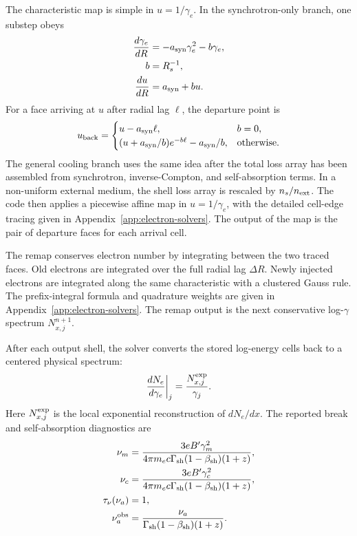\documentclass[twocolumn]{aastex702}
\begin{document}
The characteristic map is simple in \(u=1/\gamma_e\).  In the synchrotron-only
branch, one substep obeys
\begin{equation}
\begin{aligned}
\frac{d\gamma_e}{dR}&=-a_{\rm syn}\gamma_e^2-b\gamma_e,\\
b&=R_s^{-1},\\
\frac{du}{dR}&=a_{\rm syn}+bu .
\end{aligned}
\end{equation}
For a face arriving at \(u\) after radial lag \(\ell\), the departure point is
\begin{equation}
u_{\rm back}=
\begin{cases}
u-a_{\rm syn}\ell, & b=0,\\
(u+a_{\rm syn}/b)e^{-b\ell}-a_{\rm syn}/b, & {\rm otherwise}.
\end{cases}
\end{equation}
The general cooling branch uses the same idea after the total loss array has
been assembled from synchrotron, inverse-Compton, and self-absorption terms.  In
a non-uniform external medium, the shell loss array is rescaled by
\(n_s/n_{\rm ext}\).  The code then applies a piecewise affine map in
\(u=1/\gamma_e\), with the detailed cell-edge tracing given in
Appendix~\ref{app:electron-solvers}.  The output of the map is the pair of
departure faces for each arrival cell.

The remap conserves electron number by integrating between the two traced faces.
Old electrons are integrated over the full radial lag \(\Delta R\).  Newly
injected electrons are integrated along the same characteristic with a clustered
Gauss rule.  The prefix-integral formula and quadrature weights are given in
Appendix~\ref{app:electron-solvers}.  The remap output is the next conservative
log-\(\gamma\) spectrum \(N_{x,j}^{n+1}\).

After each output shell, the solver converts the stored log-energy cells back to
a centered physical spectrum:
\begin{equation}
\frac{dN_e}{d\gamma_e}\bigg|_j
=\frac{N_{x,j}^{\rm exp}}{\gamma_j}.
\end{equation}
Here \(N_{x,j}^{\rm exp}\) is the local exponential reconstruction of
\(dN_e/dx\).  The reported break and self-absorption diagnostics are
\begin{equation}
\begin{aligned}
\nu_m&=\frac{3eB'\gamma_m^2}
{4\pi m_ec\Gamma_{\rm sh}(1-\beta_{\rm sh})(1+z)},\\
\nu_c&=\frac{3eB'\gamma_c^2}
{4\pi m_ec\Gamma_{\rm sh}(1-\beta_{\rm sh})(1+z)},\\
\tau_\nu(\nu_a)&=1,\\
\nu_a^{\rm obs}&=\frac{\nu_a}
{\Gamma_{\rm sh}(1-\beta_{\rm sh})(1+z)}.
\end{aligned}
\end{equation}
\end{document}

